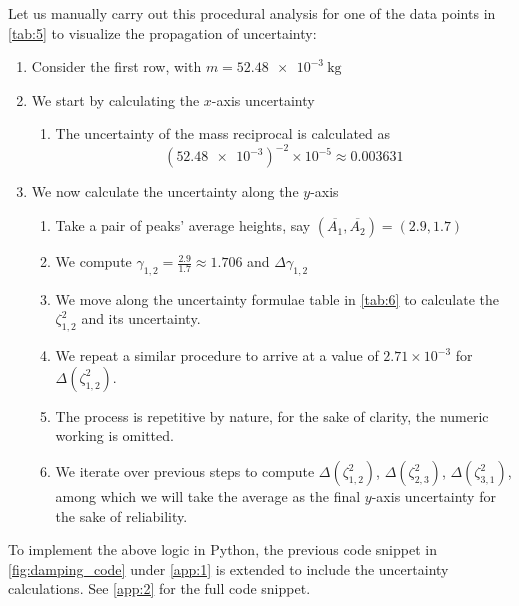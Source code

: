 \documentclass[a4paper,12pt]{article}
\begin{document}
Let us manually carry out this procedural analysis for one of the data points in \cref{tab:5} to visualize the propagation of uncertainty:
\begin{enumerate}
  \item Consider the first row, with $m = \SI{52.48e-3}{\kilo\g}$
  \item We start by calculating the $x$-axis uncertainty
        \begin{enumerate}
          \item The uncertainty of the mass reciprocal is calculated as $$(\num{52.48e-3})^{-2}\times 10^{-5} \approx 0.003631$$
        \end{enumerate}
  \item We now calculate the uncertainty along the $y$-axis
        \begin{enumerate}
          \item Take a pair of peaks' average heights, say $(\overline{A_1}, \overline{A_2}) = (2.9, 1.7)$
          \item We compute $\gamma_{1, 2} = \frac{2.9}{1.7} \approx 1.706$ and $\Delta \gamma_{1, 2}$
          \item We move along the uncertainty formulae table in \cref{tab:6} to calculate the $\zeta_{1, 2}^2$ and its uncertainty.
          \item We repeat a similar procedure to arrive at a value of $2.71 \times 10^{-3}$ for $\Delta (\zeta_{1, 2}^2)$.
          \item The process is repetitive by nature, for the sake of clarity, the numeric working is omitted.
          \item We iterate over previous steps to compute $\Delta (\zeta_{1, 2}^2)$, $\Delta (\zeta_{2, 3}^2)$, $\Delta (\zeta_{3, 1}^2)$, among which we will take the average as the final $y$-axis uncertainty for the sake of reliability.
        \end{enumerate}
\end{enumerate}

To implement the above logic in Python, the previous code snippet in \cref{fig:damping_code} under \cref{app:1} is extended to include the uncertainty calculations. See \cref{app:2} for the full code snippet.
\end{document}
